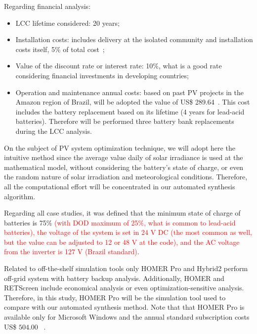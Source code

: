 \documentclass[review]{elsarticle}
\begin{document}
Regarding financial analysis:
\begin{itemize}
	\item LCC lifetime considered: 20 years;
	\item Installation costs: includes delivery at the isolated community and installation costs itself, 5\% of total cost~\cite{Agrener2013};
	\item Value of the discount rate or interest rate: 10\%, what is a good rate considering financial investments in developing countries;
	\item Operation and maintenance annual costs: based on past PV projects in the Amazon region of Brazil, will be adopted the value of US\$ 289.64~\citep{Agrener2013}. This cost includes the battery replacement based on its lifetime (4 years for lead-acid batteries). Therefore will be performed three battery bank replacements during the LCC analysis.
\end{itemize}

On the subject of PV system optimization technique, we will adopt here the intuitive method since the average value daily of solar irradiance is used at the mathematical model, without considering the battery's state of charge, or even the random nature of solar irradiation and meteorological conditions. Therefore, all the computational effort will be concentrated in our automated synthesis algorithm.

Regarding all case studies, it was defined that the minimum state of charge of batteries is 75\% \textcolor{red}{(with DOD maximum of 25\%, what is common to lead-acid batteries), the voltage of the system is set in 24 V DC (the most common as well, but the value can be adjusted to 12 or 48 V at the code), and the AC voltage from the inverter is 127 V (Brazil standard)}.

Related to off-the-shelf simulation tools only HOMER Pro and Hybrid2 perform off-grid system with battery backup analysis. %
Additionally, HOMER and RETScreen include economical analysis or even optimization-sensitive analysis. Therefore, in this study, HOMER Pro will be the simulation tool used to compare with our automated synthesis method. Note that that HOMER Pro is available only for Microsoft Windows and the annual standard subscription costs US\$ $504.00$ \textcolor{red}{~\cite{HOMER}}.
\end{document}
